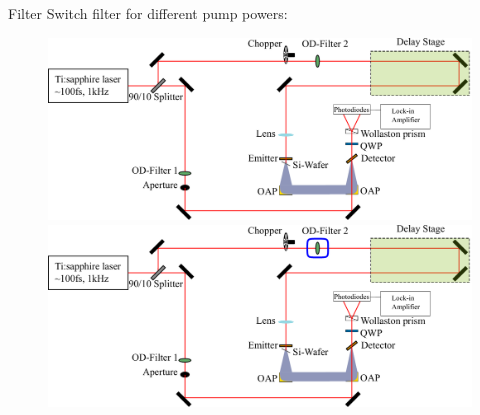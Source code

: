 \documentclass[aspectratio=1610, 9pt]{beamer}
\begin{document}
\begin{frame}{Filter}
  Switch filter for different pump powers:
  \begin{center}
  \begin{figure}
    \begin{overprint}
      \includegraphics[width=\textwidth]{images/Aufbau.pdf}
      \includegraphics[width=\textwidth]{images/Aufbau_blue_square.pdf}
    \end{overprint}
  \end{figure}  
\end{center}
\end{frame}
\end{document}
